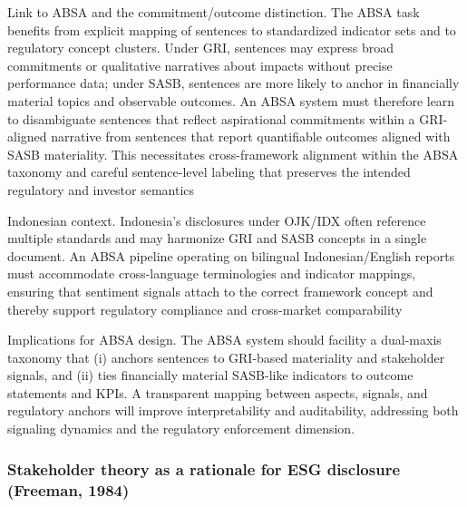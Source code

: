 Link to ABSA and the commitment/outcome distinction. The ABSA task benefits from explicit mapping of sentences to standardized indicator sets and to regulatory concept clusters. Under GRI, sentences may express broad commitments or qualitative narratives about impacts without precise performance data; under SASB, sentences are more likely to anchor in financially material topics and observable outcomes. An ABSA system must therefore learn to disambiguate sentences that reflect aspirational commitments within a GRI-aligned narrative from sentences that report quantifiable outcomes aligned with SASB materiality. This necessitates cross-framework alignment within the ABSA taxonomy and careful sentence-level labeling that preserves the intended regulatory and investor semantics \cite{10.1002/bsd2.70172,10.1108/medar-11-2021-1486,10.1007/978-3-319-04723-2_7,10.3390/su11041093,10.1108/ijlma-06-2022-0113} 

Indonesian context. Indonesia’s disclosures under OJK/IDX often reference multiple standards and may harmonize GRI and SASB concepts in a single document. An ABSA pipeline operating on bilingual Indonesian/English reports must accommodate cross-language terminologies and indicator mappings, ensuring that sentiment signals attach to the correct framework concept and thereby support regulatory compliance and cross-market comparability \cite{10.22617/tcs210472-2,10.1108/mf-01-2023-0020,10.1007/s40804-021-00233-z,10.1016/j.inffus.2025.103073,10.1111/eufm.12509}

Implications for ABSA design. The ABSA system should facility a dual-maxis taxonomy that (i) anchors sentences to GRI-based materiality and stakeholder signals, and (ii) ties financially material SASB-like indicators to outcome statements and KPIs. A transparent mapping between aspects, signals, and regulatory anchors will improve interpretability and auditability, addressing both signaling dynamics and the regulatory enforcement dimension.

\subsubsection{Stakeholder theory as a rationale for ESG disclosure (Freeman, 1984)}

